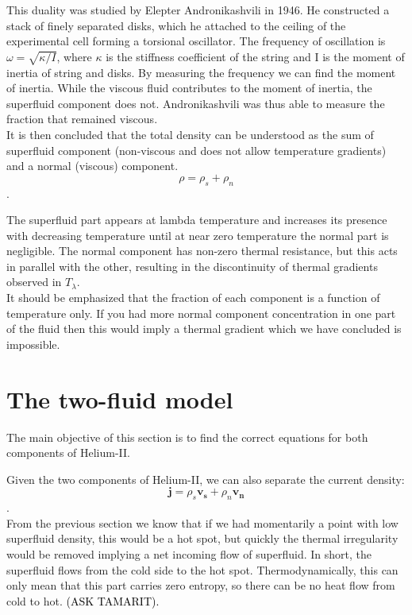 \documentclass{article}
\newcommand{\black}{\textcolor{black}}
\begin{document}
This duality was studied by Elepter Andronikashvili in 1946. He constructed a stack of finely separated disks, which he attached to the ceiling of the experimental cell forming a torsional oscillator. The frequency of oscillation is $\omega = \sqrt{\kappa/I}$, where $\kappa$ is the stiffness coefficient of the string and I is the moment of inertia of string and disks. By measuring the frequency we can find the moment of inertia. While the viscous fluid contributes to the moment of inertia, the superfluid component does not. Andronikashvili was thus able to measure the fraction that remained viscous.
\\

It is then concluded that the total density can be understood as the sum of superfluid component (non-viscous and does not allow temperature gradients) and a normal (viscous) component.
\\

\[\rho = \rho_s + \rho_n\].

The superfluid part appears at lambda temperature and increases its presence with decreasing temperature until at near zero temperature the normal part is negligible. The normal component has non-zero thermal resistance, but this acts in parallel with the other, resulting in the discontinuity of thermal gradients observed in $T_\lambda$.
\\

It should be emphasized that the fraction of each component is a function of temperature only. If you had more normal component concentration in one part of the fluid then this would imply a thermal gradient which we have concluded is impossible.
\\

\section{The two-fluid model}


The main objective of this section is to find the correct equations for both components of Helium-II.

Given the two components of Helium-II, we can also separate the current density:
\[\mathbf{j} = \rho_s \mathbf{v_s}+\rho_n \mathbf{v_n}\].
\\

From the previous section we know that if we had momentarily a point with low superfluid density, this would be a hot spot, but quickly the thermal irregularity would be removed implying a net incoming flow of superfluid. In short, the superfluid flows from the cold side to the hot spot. Thermodynamically, this can only mean that this part carries zero entropy, so there can be no heat flow from cold to hot. \black{(ASK TAMARIT).}
\\
\end{document}
